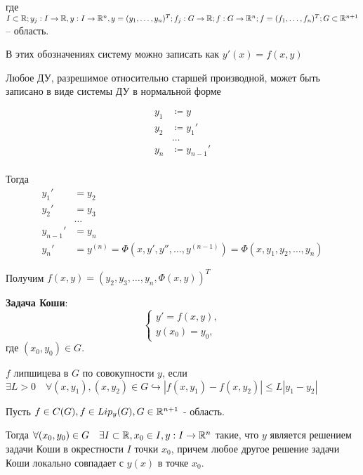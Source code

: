 где $I \subset \mathbb{R}; y_j: I \rightarrow \mathbb{R}, y: I \rightarrow \mathbb{R}^n, y = (y_1, \dots, y_n)^T; f_j: G \rightarrow \mathbb{R}; f: G \rightarrow \mathbb{R}^n; f = (f_1, \dots, f_n)^T; G \subset \mathbb{R}^{n+1}$ -- область.

В этих обозначениях систему можно записать как $y'(x) = f(x, y)$

\Statement Любое ДУ, разрешимое относительно старшей производной, может быть записано в виде системы ДУ в нормальной форме

\Proof

\begin{align*}
    y_1 &\coloneqq y \\
    y_2 &\coloneqq y_1' \\
    &\dots \\
    y_n &\coloneqq y_ {n-1}' \\
\end{align*}

Тогда
\begin{align*}
    y_1' &= y_2 \\
    y_2' &= y_3 \\
    &\dots \\
    y_{n-1}' &= y_n \\
    y_n' &= y^{(n)} = \Phi(x, y', y'', \dots, y^{(n-1)}) = \Phi(x, y_1, y_2, \dots, y_n)
\end{align*}

Получим $f(x, y) = (y_2, y_3, \dots, y_n, \Phi(x, y))^T$

\Endproof

\Def \textbf{Задача Коши}:
\begin{equation*}
    \begin{cases}
        y' = f(x, y), \\
        y(x_0) = y_0,
    \end{cases}
\end{equation*}
где $(x_0, y_0) \in G$.

\Def $f$ липшицева в $G$ по совокупности $y$, если $\exists L > 0\quad\forall (x, y_1), (x, y_2) \in G \hookrightarrow |f(x, y_1) - f(x, y_2)| \leq L |y_1 - y_2|$


Пусть $f \in C(G), f \in Lip_y(G), G \in \mathbb{R}^{n+1}$ - область.

Тогда $\forall (x_0, y_0) \in G \quad \exists I \subset \mathbb{R}, x_0 \in I, y: I \rightarrow \mathbb{R}^n$ такие, что $y$ является решением задачи Коши в окрестности $I$ точки $x_0$, причем любое другое решение задачи Коши локально совпадает с $y(x)$ в точке $x_0$.



